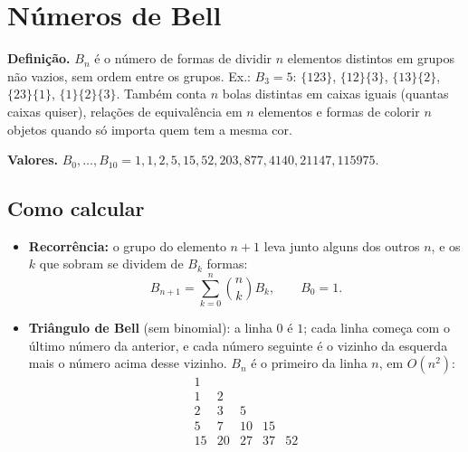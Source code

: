 \section{Números de Bell}

\textbf{Definição.} $B_n$ é o número de formas de dividir $n$ elementos distintos em grupos não vazios, sem ordem
entre os grupos. Ex.: $B_3 = 5$: $\{123\}$, $\{12\}\{3\}$, $\{13\}\{2\}$, $\{23\}\{1\}$, $\{1\}\{2\}\{3\}$. Também
conta $n$ bolas distintas em caixas iguais (quantas caixas quiser), relações de equivalência em $n$ elementos e
formas de colorir $n$ objetos quando só importa quem tem a mesma cor.

\textbf{Valores.} $B_0, \dots, B_{10} = 1, 1, 2, 5, 15, 52, 203, 877, 4140, 21147, 115975$.

\subsection*{Como calcular}

\begin{itemize}
  \item \textbf{Recorrência:} o grupo do elemento $n + 1$ leva junto alguns dos outros $n$, e os $k$ que sobram se
        dividem de $B_k$ formas:
        \[
        \boxed{B_{n+1} = \sum_{k=0}^{n} \binom{n}{k} B_k}, \qquad B_0 = 1.
        \]
  \item \textbf{Triângulo de Bell} (sem binomial): a linha $0$ é $1$; cada linha começa com o último número da
        anterior, e cada número seguinte é o vizinho da esquerda mais o número acima desse vizinho. $B_n$ é o
        primeiro da linha $n$, em $O(n^2)$:
        \[
        \begin{array}{lllll}
          1 \\
          1 & 2 \\
          2 & 3 & 5 \\
          5 & 7 & 10 & 15 \\
          15 & 20 & 27 & 37 & 52
        \end{array}
        \]
\end{itemize}

